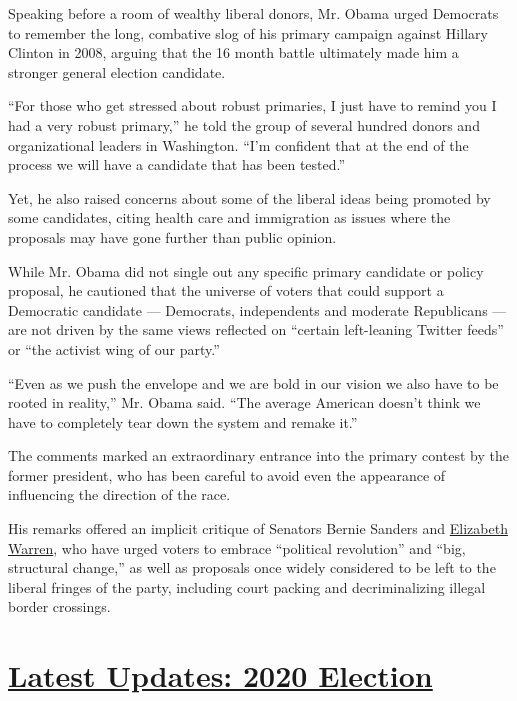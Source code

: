 Speaking before a room of wealthy liberal donors, Mr. Obama urged
Democrats to remember the long, combative slog of his primary campaign
against Hillary Clinton in 2008, arguing that the 16 month battle
ultimately made him a stronger general election candidate.

``For those who get stressed about robust primaries, I just have to
remind you I had a very robust primary,'' he told the group of several
hundred donors and organizational leaders in Washington. ``I'm confident
that at the end of the process we will have a candidate that has been
tested.''

Yet, he also raised concerns about some of the liberal ideas being
promoted by some candidates, citing health care and immigration as
issues where the proposals may have gone further than public opinion.

While Mr. Obama did not single out any specific primary candidate or
policy proposal, he cautioned that the universe of voters that could
support a Democratic candidate --- Democrats, independents and moderate
Republicans --- are not driven by the same views reflected on ``certain
left-leaning Twitter feeds'' or ``the activist wing of our party.''

``Even as we push the envelope and we are bold in our vision we also
have to be rooted in reality,'' Mr. Obama said. ``The average American
doesn't think we have to completely tear down the system and remake
it.''

The comments marked an extraordinary entrance into the primary contest
by the former president, who has been careful to avoid even the
appearance of influencing the direction of the race.

His remarks offered an implicit critique of Senators Bernie Sanders and
\href{https://www.nytimes3xbfgragh.onion/2019/11/01/us/politics/iowa-poll-warren-biden.html?module=inline}{Elizabeth
Warren}, who have urged voters to embrace ``political revolution'' and
``big, structural change,'' as well as proposals once widely considered
to be left to the liberal fringes of the party, including court packing
and decriminalizing illegal border crossings.

\hypertarget{latest-updates-2020-election}{%
\section{\texorpdfstring{\href{https://www.nytimes3xbfgragh.onion/live/2020/08/19/us/dnc-convention-election?action=click\&pgtype=Article\&state=default\&region=MAIN_CONTENT_1\&context=storylines_live_updates}{Latest
Updates: 2020
Election}}{Latest Updates: 2020 Election}}\label{latest-updates-2020-election}}

